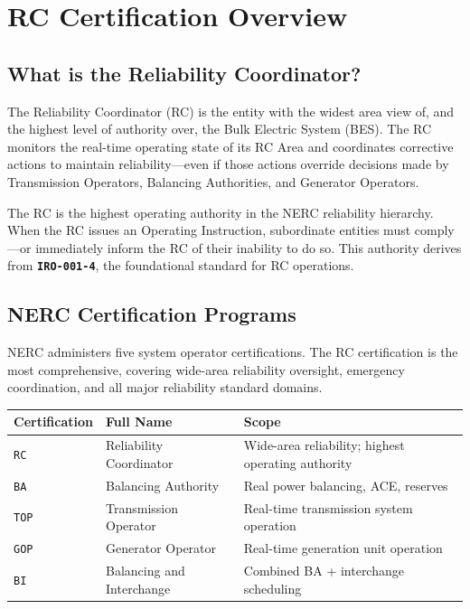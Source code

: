 \documentclass[12pt,twoside,openright]{memoir}
\newcommand{\std}[1]{\texttt{\textbf{#1}}}
\begin{document}
\mainmatter

\chapter{RC Certification Overview}
\label{ch:intro}

\section{What is the Reliability Coordinator?}

The Reliability Coordinator (RC) is the entity with the widest area view of, and the
highest level of authority over, the Bulk Electric System (BES). The RC monitors the
real-time operating state of its RC Area and coordinates corrective actions to maintain
reliability—even if those actions override decisions made by Transmission Operators,
Balancing Authorities, and Generator Operators.

\begin{keyconcept}
The RC is the highest operating authority in the NERC reliability hierarchy.
When the RC issues an Operating Instruction, subordinate entities must comply—or
immediately inform the RC of their inability to do so. This authority derives from
\std{IRO-001-4}, the foundational standard for RC operations.
\end{keyconcept}

\section{NERC Certification Programs}

NERC administers five system operator certifications. The RC certification is the
most comprehensive, covering wide-area reliability oversight, emergency coordination,
and all major reliability standard domains.

\begin{center}
\begin{tabular}{@{}llp{6cm}@{}}
\toprule
\rowcolor{nercblue!15}
\textbf{Certification} & \textbf{Full Name} & \textbf{Scope} \\
\midrule
\texttt{RC} & Reliability Coordinator & Wide-area reliability; highest operating authority \\
\rowcolor{rowlight}
\texttt{BA} & Balancing Authority & Real power balancing, ACE, reserves \\
\texttt{TOP} & Transmission Operator & Real-time transmission system operation \\
\rowcolor{rowlight}
\texttt{GOP} & Generator Operator & Real-time generation unit operation \\
\texttt{BI} & Balancing and Interchange & Combined BA + interchange scheduling \\
\bottomrule
\end{tabular}
\end{center}
\end{document}
